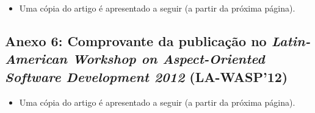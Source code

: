 \begin{figure}[!h]
 \centering
 \label{fig:comprovante_vmil}
\end{figure}

\begin{itemize}
	\item Uma cópia do artigo é apresentado a seguir (a partir da próxima página).
\end{itemize}
\clearpage



\subsection*{Anexo 6: Comprovante da publicação no \emph{Latin-American Workshop on Aspect-Oriented Software Development 2012} (LA-WASP'12)} \label{anexo:comprovante_SBES}


\begin{figure}[!h]
 \centering
 \label{fig:comprovante_vmil}
\end{figure}

\begin{itemize}
	\item Uma cópia do artigo é apresentado a seguir (a partir da próxima página).
\end{itemize}
\clearpage

